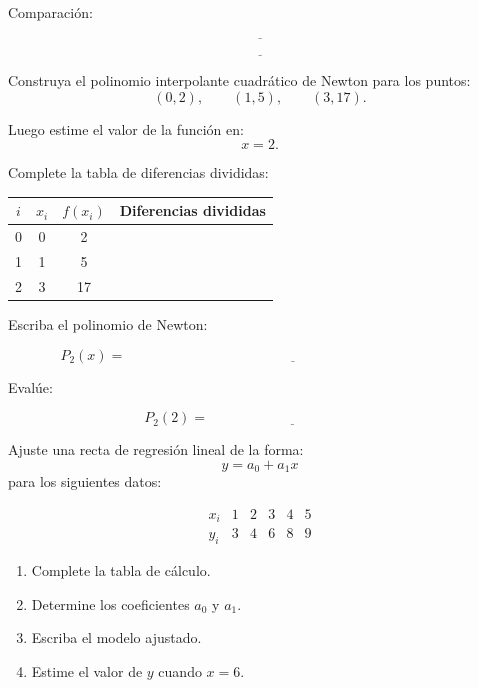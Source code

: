 \documentclass[10pt,respuestas,a4]{aleph-examen}
\begin{document}
\begin{preguntas}
\vspace{0.3cm}

Comparación:

\[
\underline{\hspace{14cm}}
\]

\[
\underline{\hspace{14cm}}
\]


\item
Construya el polinomio interpolante cuadrático de Newton para los puntos: 
\[
(0,2), \qquad (1,5), \qquad (3,17).
\]

Luego estime el valor de la función en:
\[
x=2.
\]

Complete la tabla de diferencias divididas:

\begin{center}
\renewcommand{\arraystretch}{1.5}
\begin{tabular}{c|c|c|c}
\toprule
$i$ & $x_i$ & $f(x_i)$ & Diferencias divididas \\
\midrule
0 & 0 & 2 &  \\
1 & 1 & 5 &  \\
2 & 3 & 17 &  \\
\bottomrule
\end{tabular}
\end{center}

Escriba el polinomio de Newton:

\[
P_2(x)=\underline{\hspace{10cm}}
\]

Evalúe:

\[
P_2(2)=\underline{\hspace{5cm}}
\]


\item
Ajuste una recta de regresión lineal de la forma: 
\[
y=a_0+a_1x
\]
para los siguientes datos:

\[
\begin{array}{c|ccccc}
x_i & 1 & 2 & 3 & 4 & 5 \\
\hline
y_i & 3 & 4 & 6 & 8 & 9
\end{array}
\]

\begin{enumerate}[label=\alph*)]
    \item Complete la tabla de cálculo.
    \item Determine los coeficientes $a_0$ y $a_1$.
    \item Escriba el modelo ajustado.
    \item Estime el valor de $y$ cuando $x=6$.
\end{enumerate}


\end{preguntas}
\end{document}
